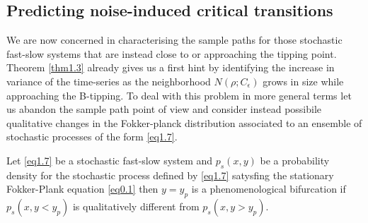 \documentclass[../main.tex]{subfiles}
\begin{document}
\subsection{Predicting noise-induced critical transitions}\label{subsec2.3}
We are now concerned in characterising the sample paths for those stochastic fast-slow systems that are instead close to or approaching the tipping point. Theorem \ref{thm1.3} already gives us a first hint by identifying the increase in variance of the time-series as the neighborhood $N(\rho;C_{\epsilon})$ grows in size while approaching the B-tipping. 
To deal with this problem in more general terms let us abandon the sample path point of view and consider instead possibile qualitative changes in the Fokker-planck distribution associated to an ensemble of stochastic processes of the form \eqref{eq1.7}.
\begin{definition}\label{def1.5}
     Let \eqref{eq1.7} be a stochastic fast-slow system and $p_{s}(x,y)$ be a probability density for the stochastic process defined by \eqref{eq1.7} satysfing the stationary Fokker-Plank equation \eqref{eq0.1} then $y=y_{p}$ is a phenomenological bifurcation if $p_{s}(x,y<y_{p})$ is qualitatively different from $p_{s}(x,y>y_{p})$. 
\end{definition}
\end{document}

